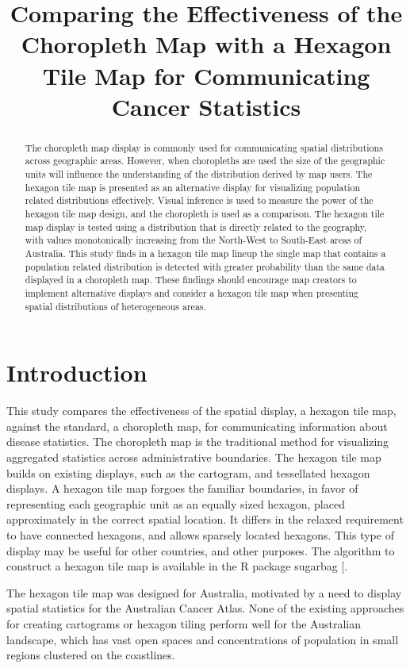 \documentclass[
]{article}
\title{Comparing the Effectiveness of the Choropleth Map with a Hexagon
Tile Map for Communicating Cancer Statistics}
\author{}
\date{\vspace{-2.5em}}
\begin{document}
\maketitle
\begin{abstract}
The choropleth map display is commonly used for communicating spatial
distributions across geographic areas. However, when choropleths are
used the size of the geographic units will influence the understanding
of the distribution derived by map users. The hexagon tile map is
presented as an alternative display for visualizing population related
distributions effectively. Visual inference is used to measure the power
of the hexagon tile map design, and the choropleth is used as a
comparison. The hexagon tile map display is tested using a distribution
that is directly related to the geography, with values monotonically
increasing from the North-West to South-East areas of Australia. This
study finds in a hexagon tile map lineup the single map that contains a
population related distribution is detected with greater probability
than the same data displayed in a choropleth map. These findings should
encourage map creators to implement alternative displays and consider a
hexagon tile map when presenting spatial distributions of heterogeneous
areas.
\end{abstract}

\section{Introduction}\label{introduction}

This study compares the effectiveness of the spatial display, a hexagon
tile map, against the standard, a choropleth map, for communicating
information about disease statistics. The choropleth map is the
traditional method for visualizing aggregated statistics across
administrative boundaries. The hexagon tile map builds on existing
displays, such as the cartogram, and tessellated hexagon displays. A
hexagon tile map forgoes the familiar boundaries, in favor of
representing each geographic unit as an equally sized hexagon, placed
approximately in the correct spatial location. It differs in the relaxed
requirement to have connected hexagons, and allows sparsely located
hexagons. This type of display may be useful for other countries, and
other purposes. The algorithm to construct a hexagon tile map is
available in the R package sugarbag {[}\citeproc{ref-sugarbag}{1}{]}.

The hexagon tile map was designed for Australia, motivated by a need to
display spatial statistics for the Australian Cancer Atlas. None of the
existing approaches for creating cartograms or hexagon tiling perform
well for the Australian landscape, which has vast open spaces and
concentrations of population in small regions clustered on the
coastlines.
\end{document}
